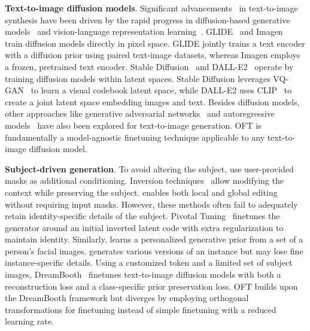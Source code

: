 \textbf{Text-to-image diffusion models}. Significant advancements~\cite{saharia2022photorealistic,ramesh2022hierarchical,rombach2022high,gu2022vector,nichol2022glide} in text-to-image synthesis have been driven by the rapid progress in diffusion-based generative models~\cite{ho2020denoising,song2021score,song2021denoising,dhariwal2021diffusion} and vision-language representation learning~\cite{su2020vlbert,lu2019vilbert,radford2021learning,wang2021simvlm,li2022blip,li2023blip,alayrac2022flamingo,schuhmann2022laion}. GLIDE~\cite{nichol2022glide} and Imagen~\cite{saharia2022photorealistic} train diffusion models directly in pixel space. GLIDE jointly trains a text encoder with a diffusion prior using paired text-image datasets, whereas Imagen employs a frozen, pretrained text encoder. Stable Diffusion~\cite{rombach2022high} and DALL-E2~\cite{ramesh2022hierarchical} operate by training diffusion models within latent spaces. Stable Diffusion leverages VQ-GAN~\cite{esser2021taming} to learn a visual codebook latent space, while DALL-E2 uses CLIP~\cite{radford2021learning} to create a joint latent space embedding images and text. Besides diffusion models, other approaches like generative adversarial networks~\cite{reed2016generative,zhang2017stackgan,xu2018attngan,li2019controllable} and autoregressive models~\cite{ramesh2021zero,ding2021cogview,wu2022nuwa,yuscaling} have also been explored for text-to-image generation. OFT is fundamentally a model-agnostic finetuning technique applicable to any text-to-image diffusion model.

\textbf{Subject-driven generation}. To avoid altering the subject, \cite{avrahami2022blended,nichol2022glide} use user-provided masks as additional conditioning. Inversion techniques~\cite{choi2021ilvr,dhariwal2021diffusion,ramesh2022hierarchical,gal2022image} allow modifying the context while preserving the subject. \cite{hertz2022prompt} enables both local and global editing without requiring input masks. However, these methods often fail to adequately retain identity-specific details of the subject. Pivotal Tuning~\cite{roich2022pivotal} finetunes the generator around an initial inverted latent code with extra regularization to maintain identity. Similarly, \cite{nitzan2022mystyle} learns a personalized generative prior from a set of a person's facial images. \cite{casanova2021instance} generates various versions of an instance but may lose fine instance-specific details. Using a customized token and a limited set of subject images, DreamBooth~\cite{ruiz2023dreambooth} finetunes text-to-image diffusion models with both a reconstruction loss and a class-specific prior preservation loss. OFT builds upon the DreamBooth framework but diverges by employing orthogonal transformations for finetuning instead of simple finetuning with a reduced learning rate.

